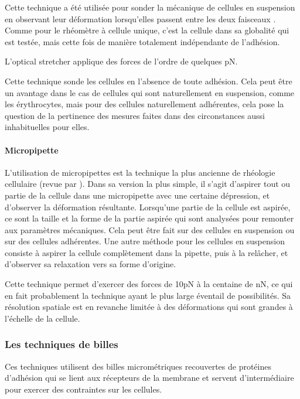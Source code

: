Cette technique a été utilisée pour sonder la mécanique de cellules en suspension en observant leur déformation lorsqu'elles passent entre les deux faisceaux \parencite{guck_optical_2001}. 
Comme pour le rhéomètre à cellule unique, c'est la cellule dans sa globalité qui est testée, mais cette fois de manière totalement indépendante de l'adhésion. 

L'optical stretcher applique des forces de l'ordre de quelques pN. 

Cette technique sonde les cellules en l'absence de toute adhésion. Cela peut être un avantage dans le cas de cellules qui sont naturellement en suspension, comme les érythrocytes, mais pour des cellules naturellement adhérentes, cela pose la question de la pertinence des mesures faites dans des circonstances aussi inhabituelles pour elles. 

\paragraph{Micropipette}

L'utilisation de micropipettes est la technique la plus ancienne de rhéologie cellulaire (revue par \cite{hochmuth_micropipette_2000}). 
Dans sa version la plus simple, il s'agit d'aspirer tout ou partie de la cellule dans une micropipette avec une certaine dépression, et d'observer la déformation résultante. 
Lorsqu'une partie de la cellule est aspirée, ce sont la taille et la forme de la partie aspirée qui sont analysées pour remonter aux paramètres mécaniques. 
Cela peut être fait sur des cellules en suspension ou sur des cellules adhérentes.
Une autre méthode pour les cellules en suspension consiste à aspirer la cellule complètement dans la pipette, puis à la relâcher, et d'observer sa relaxation vers sa forme d'origine. 

 

Cette technique permet d'exercer des forces de 10pN à la centaine de nN, ce qui en fait probablement la technique ayant le plus large éventail de possibilités. Sa résolution spatiale est en revanche limitée à des déformations qui sont grandes à l'échelle de la cellule. 



\subsubsection{Les techniques de billes}
Ces techniques utilisent des billes micrométriques recouvertes de protéines d'adhésion qui se lient aux récepteurs de la membrane et servent d'intermédiaire pour exercer des contraintes sur les cellules. 

